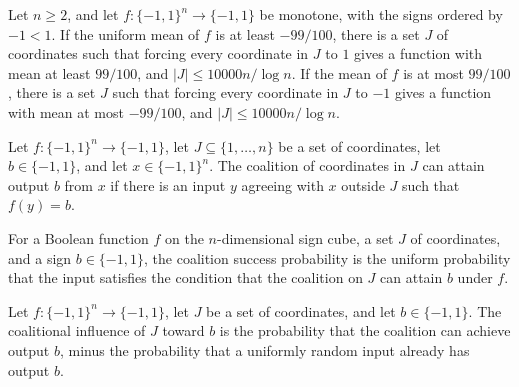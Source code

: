 \begin{theorem}
\label{FABL.proposition9_27}
\leanok
{}
Let $n\ge 2$, and let $f:\{-1,1\}^n\to\{-1,1\}$ be monotone, with the signs ordered by
$-1<1$. If the uniform mean of $f$ is at least $-99/100$, there is a set $J$ of
coordinates such that forcing every coordinate in $J$ to $1$ gives a function with mean
at least $99/100$, and $|J|\le 10000n/\log n$. If the mean of $f$ is at most $99/100$,
there is a set $J$ such that forcing every coordinate in $J$ to $-1$ gives a function
with mean at most $-99/100$, and $|J|\le 10000n/\log n$.
\end{theorem}

\begin{definition}
\label{FABL.CoalitionCanAttain}
\leanok
{}
Let $f:\{−1,1\}^n\to\{−1,1\}$, let $J\subseteq\{1,\ldots,n\}$ be a set of coordinates,
let $b\in\{−1,1\}$, and let $x\in\{−1,1\}^n$. The coalition of coordinates in $J$ can
attain output $b$ from $x$ if there is an input $y$ agreeing with $x$ outside $J$ such
that $f(y)=b$.
\end{definition}

\begin{definition}
\label{FABL.coalitionSuccessProbability}
\leanok
{}
For a Boolean function $f$ on the $n$-dimensional sign cube, a set $J$ of coordinates,
and a sign $b\in\{-1,1\}$, the coalition success probability is the uniform probability
that the input satisfies the condition that the coalition on $J$ can attain $b$ under
$f$.
\end{definition}

\begin{definition}
\label{FABL.coalitionalInfluenceToward}
\leanok
{}
Let $f:\{−1,1\}^n\to\{−1,1\}$, let $J$ be a set of coordinates, and let $b\in\{−1,1\}$.
The coalitional influence of $J$ toward $b$ is the probability that the coalition can
achieve output $b$, minus the probability that a uniformly random input already has
output $b$.
\end{definition}

